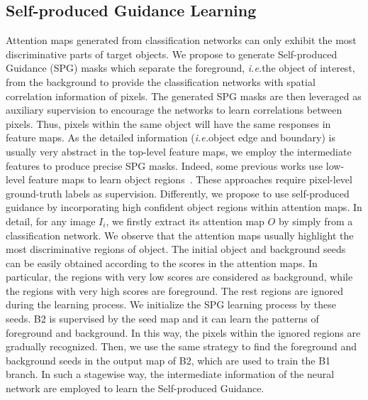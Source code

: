\documentclass[runningheads]{llncs}
\newcommand{\ie}{\emph{i.e.}}
\begin{document}
\subsection{Self-produced Guidance Learning}
Attention maps generated from classification networks can only exhibit the most discriminative parts of target objects.
We propose to generate Self-produced Guidance (SPG) masks which separate the foreground, \ie the object of interest, from the background to provide the classification networks with spatial correlation information of pixels.
The generated SPG masks are then leveraged as auxiliary supervision to encourage the networks to learn correlations between pixels.
Thus, pixels within the same object will have the same responses in feature maps.
As the detailed information (\ie object edge and boundary) is usually very abstract in the top-level feature maps,
we employ the intermediate features to produce precise SPG masks.
Indeed, some previous works use low-level feature maps to learn object regions~\cite{xie2015holistically,hou2017deeply}.
These approaches require pixel-level ground-truth labels as supervision.
Differently, we propose to use self-produced guidance by incorporating high confident object regions within attention maps.
In detail, for any image $I_i$, we firstly extract its attention map $O$ by simply from a classification network.
We observe that the attention maps usually highlight the most discriminative regions of object.
The initial object and background seeds can be easily obtained according to the scores in the attention maps.
In particular, the regions with very low scores are considered as background, while the regions with very high scores are foreground.
The rest regions are ignored during the learning process.
We initialize the SPG learning process by these seeds.
B2 is supervised by the seed map and it can learn the patterns of foreground and background.
In this way, the pixels within the ignored regions are gradually recognized.
Then, we use the same strategy to find the foreground and background seeds in the output map of B2, which are used to train the B1 branch.
In such a stagewise way, the intermediate information of the neural network are employed to learn the Self-produced Guidance.
\end{document}
